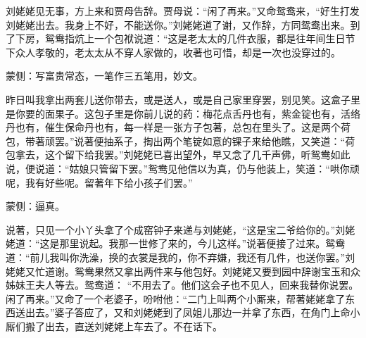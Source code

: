 \begin{parag}
    刘姥姥见无事，方上来和贾母告辞。贾母说：“闲了再来。”又命鸳鸯来，“好生打发刘姥姥出去。我身上不好，不能送你。”刘姥姥道了谢，又作辞，方同鸳鸯出来。到了下房，鸳鸯指炕上一个包袱说道：“这是老太太的几件衣服，都是往年间生日节下众人孝敬的，老太太从不穿人家做的，收著也可惜，却是一次也没穿过的。\begin{note}蒙侧：写富贵常态，一笔作三五笔用，妙文。\end{note}昨日叫我拿出两套儿送你带去，或是送人，或是自己家里穿罢，别见笑。这盒子里是你要的面果子。这包子里是你前儿说的药：梅花点舌丹也有，紫金锭也有，活络丹也有，催生保命丹也有，每一样是一张方子包著，总包在里头了。这是两个荷包，带著顽罢。”说著便抽系子，掏出两个笔锭如意的锞子来给他瞧，又笑道：“荷包拿去，这个留下给我罢。”刘姥姥已喜出望外，早又念了几千声佛，听鸳鸯如此说，便说道：“姑娘只管留下罢。”鸳鸯见他信以为真，仍与他装上，笑道：“哄你顽呢，我有好些呢。留著年下给小孩子们罢。”\begin{note}蒙侧：逼真。\end{note}说著，只见一个小丫头拿了个成窑钟子来递与刘姥姥，“这是宝二爷给你的。”刘姥姥道：“这是那里说起。我那一世修了来的，今儿这样。”说著便接了过来。鸳鸯道：“前儿我叫你洗澡，换的衣裳是我的，你不弃嫌，我还有几件，也送你罢。”刘姥姥又忙道谢。鸳鸯果然又拿出两件来与他包好。刘姥姥又要到园中辞谢宝玉和众姊妹王夫人等去。鸳鸯道： “不用去了。他们这会子也不见人，回来我替你说罢。闲了再来。”又命了一个老婆子，吩咐他：“二门上叫两个小厮来，帮著姥姥拿了东西送出去。”婆子答应了，又和刘姥姥到了凤姐儿那边一并拿了东西，在角门上命小厮们搬了出去，直送刘姥姥上车去了。不在话下。
\end{parag}


